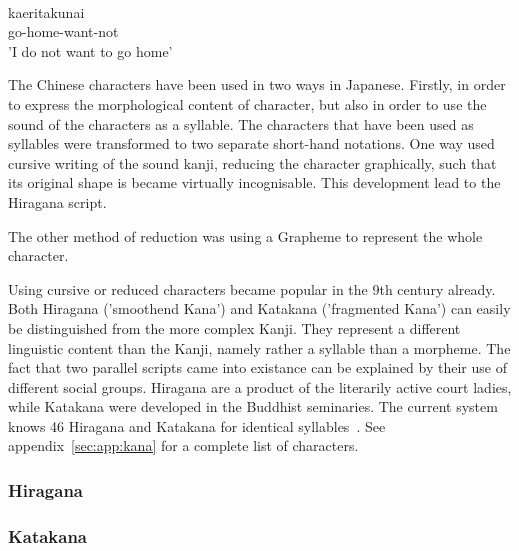 \begin{exe}
\ex\label{exe:okurigana}
\gll 
  \\
 kaeritakunai \\
 go-home-want-not \\
\trans 'I do not want to go home' \\
\end{exe}

The Chinese characters have been used in two ways in Japanese. 
Firstly, in order to express the morphological content of character,
but also in order to use the sound of the characters as a syllable.
The characters that have been used as syllables were transformed to two 
separate short-hand notations. 
One way used cursive writing of the sound kanji, reducing the character 
graphically, such that its original shape is became virtually incognisable.
This development lead to the Hiragana script.


The other method of reduction was using a Grapheme to represent the whole 
character.


Using cursive or reduced characters became popular in the 9th century already.
Both Hiragana ('smoothend Kana') and Katakana ('fragmented Kana') can easily be 
distinguished from the more complex Kanji. They represent a different linguistic 
content than the Kanji, namely rather a syllable than a morpheme.
The fact that two parallel scripts came into existance can be explained by 
their use of different social groups. Hiragana are a product of the literarily 
active court ladies, while Katakana were developed in the Buddhist seminaries.
The current system knows 46 Hiragana and Katakana for identical 
syllables~. See appendix~\ref{sec:app:kana} for a 
complete list of characters.

\subsubsection{Hiragana }
\label{sec:hiragana}

\subsubsection{Katakana }
\label{sec:katakana}

